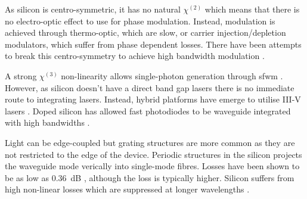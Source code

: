 As silicon is centro-symmetric, it has no natural $\chi^{(2)}$ which means that there is no electro-optic effect to use for phase modulation. Instead, modulation is achieved through thermo-optic, which are slow, or carrier injection/depletion modulators, which suffer from phase dependent losses. There have been attempts to break this centro-symmetry to achieve high bandwidth modulation \cite{cazzanelli2016second, castellan2019origin}.

A strong $\chi^{(3)}$ non-linearity allows single-photon generation through \ac{sfwm} \cite{SilverstoneThesis}. However, as silicon doesn't have a direct band gap lasers there is no immediate route to integrating lasers. Instead, hybrid platforms have emerge to utilise III-V lasers \cite{Fan2017, Agnesi2019}. Doped silicon has allowed fast photodiodes to be waveguide integrated with high bandwidths \cite{raffaelli2018generation}.

Light can be edge-coupled but grating structures are more common as they are not restricted to the edge of the device. Periodic structures in the silicon projects the waveguide mode verically into single-mode fibres. Losses have been shown to be as low as \SI{0.36}{dB} \cite{Notaros2016}, although the loss is typically higher. Silicon suffers from high non-linear losses which are suppressed at longer wavelengths \cite{rosenfeld2019mid}.





